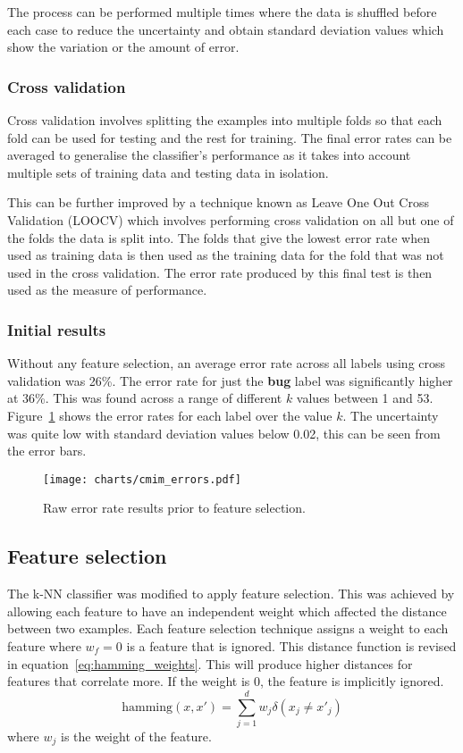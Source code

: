 The process can be performed multiple times where the data is shuffled before each case to reduce the uncertainty and obtain
standard deviation values which show the variation or the amount of error.

\subsubsection{Cross validation}
Cross validation involves splitting the examples into multiple folds so that each fold can be used for testing and the rest for
training. The final error rates can be averaged to generalise the classifier's performance as it takes into account
multiple sets of training data and testing data in isolation.

This can be further improved by a technique known as Leave One Out Cross Validation (LOOCV) which involves performing cross
validation on all but one of the folds the data is split into. The folds that give the lowest error rate when used as training
data is then used as the training data for the fold that was not used in the cross validation. The error rate produced by this
final test is then used as the measure of performance.

\subsubsection{Initial results}
\label{sec:initial_results}
Without any feature selection, an average error rate across all labels using cross validation was 26\%. The error rate for just
the \textbf{bug} label was significantly higher at 36\%. This was found across a range of different $k$ values between 1 and 53.
Figure~\ref{fig:raw_errors} shows the error rates for each label over the value $k$. The uncertainty was quite low with
standard deviation values below 0.02, this can be seen from the error bars.

\begin{figure}[h]
    \centering
    \texttt{[image: charts/cmim\_errors.pdf]}
    \caption{Raw error rate results prior to feature selection.}
    \label{fig:raw_errors}
\end{figure}

\subsection{Feature selection}
The k-NN classifier was modified to apply feature selection. This was achieved by allowing each feature to have an independent
weight which affected the distance between two examples. Each feature selection technique assigns a weight to each feature where
$w_f = 0$ is a feature that is ignored. This distance function is revised in equation~\ref{eq:hamming_weights}. This will
produce higher distances for features that correlate more. If the weight is 0, the feature is implicitly ignored.
\begin{equation}
    \label{eq:hamming_weights}
    \mathrm{hamming}(x,x') = \sum^d_{j=1} w_{j} \delta (x_{j} \neq x'_{j})
\end{equation}
where $w_{j}$ is the weight of the feature.

